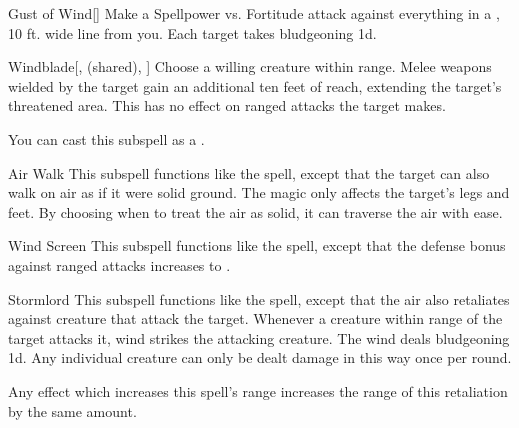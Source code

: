 \begin{ability}[\nth{3}]{Gust of Wind}[]
Make a Spellpower vs. Fortitude attack against everything in a \arealarge, 10 ft. wide line from you.
\hit Each target takes bludgeoning  \minus1d.
\end{ability}
\vspace{0.25em}


\begin{ability}[\nth{3}]{Windblade}[,  (shared), ]
Choose a willing creature within \rngclose range.
Melee weapons wielded by the target gain an additional ten feet of reach, extending the target's threatened area.
This has no effect on ranged attacks the target makes.

You can cast this subspell as a .
\end{ability}
\vspace{0.25em}


\begin{ability}[\nth{4}]{Air Walk}
This subspell functions like the  spell, except that the target can also walk on air as if it were solid ground.
The magic only affects the target's legs and feet.
By choosing when to treat the air as solid, it can traverse the air with ease.
\end{ability}
\vspace{0.25em}


\begin{ability}[\nth{4}]{Wind Screen}
This subspell functions like the  spell, except that the defense bonus against ranged attacks increases to .
\end{ability}
\vspace{0.25em}


\begin{ability}[\nth{5}]{Stormlord}
This subspell functions like the  spell, except that the air also retaliates against creature that attack the target.
Whenever a creature within \rngclose range of the target attacks it, wind strikes the attacking creature.
The wind deals bludgeoning  \minus1d.
Any individual creature can only be dealt damage in this way once per round.

Any effect which increases this spell's range increases the range of this retaliation by the same amount.
\end{ability}
\vspace{0.25em}



